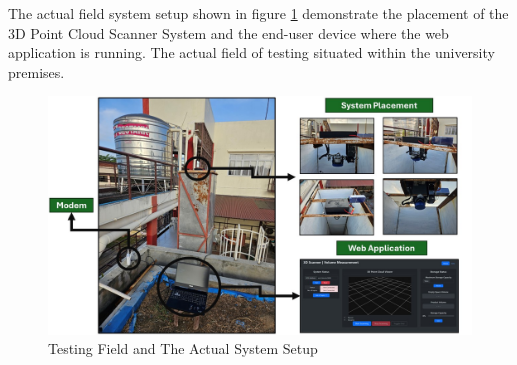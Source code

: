 





The actual field system setup shown in figure \ref{ch4:fig:actual-system-setup} demonstrate the placement of the 3D Point Cloud Scanner System and the end-user device where the web application is running. The actual field of testing situated within the university premises. \\

\begin{figure}[H]
	\centering
	\includegraphics[width=1\textwidth]{Figures/actual-system-setup}
	\caption{Testing Field and The Actual System Setup}
	\label{ch4:fig:actual-system-setup}
\end{figure}


